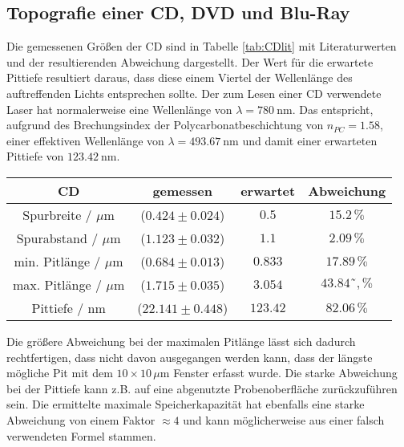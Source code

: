     \subsection{Topografie einer CD, DVD und Blu-Ray}
        Die gemessenen Größen der CD sind in Tabelle \ref{tab:CDlit} mit Literaturwerten und der resultierenden Abweichung dargestellt. Der Wert für die erwartete Pittiefe resultiert daraus, dass diese einem Viertel der Wellenlänge des auftreffenden Lichts entsprechen sollte. Der zum Lesen einer CD verwendete Laser hat normalerweise eine Wellenlänge von $\lambda=\SI{780}{\nano\metre}$. Das entspricht, aufgrund des Brechungsindex der Polycarbonatbeschichtung von $n_{PC}=1.58$, einer effektiven Wellenlänge von $\lambda=\SI{493.67}{\nano\metre}$ und damit einer erwarteten Pittiefe von $\SI{123.42}{\nano\metre}$.
        \newpage
        \begin{center}
            \label{tab:CDlit}
            \begin{tabular}{c c c c}
                \toprule
                CD & gemessen & erwartet & Abweichung \\
                \midrule
                Spurbreite / $\mu\text{m}$    & ($0.424\pm 0.024$) & $0.5$   & $15.2\,\%$ \\
                Spurabstand / $\mu\text{m}$   & ($1.123\pm 0.032$) & $1.1$   & $2.09\,\%$ \\
                min. Pitlänge / $\mu\text{m}$ & ($0.684\pm 0.013$) & $0.833$ & $17.89\,\%$ \\
                max. Pitlänge / $\mu\text{m}$ & ($1.715\pm 0.035$) & $3.054$ & $43.84˜,\%$ \\
                Pittiefe / $\text{nm}$         & ($22.141\pm 0.448$)& $123.42$& $82.06\,\%$ \\
                \bottomrule
            \end{tabular}
        \end{center}
        Die größere Abweichung bei der maximalen Pitlänge lässt sich dadurch rechtfertigen, dass nicht davon ausgegangen werden kann, dass der längste mögliche Pit mit dem $10\times 10\,\mu\text{m}$ Fenster erfasst wurde. Die starke Abweichung bei der Pittiefe kann z.B. auf eine abgenutzte Probenoberfläche zurückzuführen sein.
        Die ermittelte maximale Speicherkapazität hat ebenfalls eine starke Abweichung von einem Faktor $\approx 4$ und kann möglicherweise aus einer falsch verwendeten Formel stammen.

